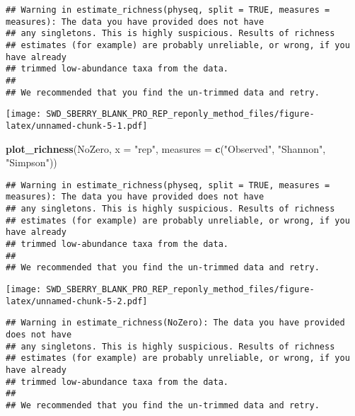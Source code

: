 \documentclass[]{article}
\newenvironment{Shaded}{\begin{snugshade}}{\end{snugshade}}
\newcommand{\KeywordTok}[1]{\textcolor[rgb]{0.13,0.29,0.53}{\textbf{#1}}}
\newcommand{\DataTypeTok}[1]{\textcolor[rgb]{0.13,0.29,0.53}{#1}}
\newcommand{\StringTok}[1]{\textcolor[rgb]{0.31,0.60,0.02}{#1}}
\newcommand{\OperatorTok}[1]{\textcolor[rgb]{0.81,0.36,0.00}{\textbf{#1}}}
\newcommand{\NormalTok}[1]{#1}
\begin{document}
\begin{verbatim}
## Warning in estimate_richness(physeq, split = TRUE, measures = measures): The data you have provided does not have
## any singletons. This is highly suspicious. Results of richness
## estimates (for example) are probably unreliable, or wrong, if you have already
## trimmed low-abundance taxa from the data.
## 
## We recommended that you find the un-trimmed data and retry.
\end{verbatim}

\texttt{[image: SWD\_SBERRY\_BLANK\_PRO\_REP\_reponly\_method\_files/figure-latex/unnamed-chunk-5-1.pdf]}

\begin{Shaded}
\begin{Highlighting}[]
\KeywordTok{plot_richness}\NormalTok{(NoZero, }\DataTypeTok{x =} \StringTok{"rep"}\NormalTok{, }\DataTypeTok{measures =} \KeywordTok{c}\NormalTok{(}\StringTok{"Observed"}\NormalTok{, }\StringTok{"Shannon"}\NormalTok{, }\StringTok{"Simpson"}\NormalTok{))}
\end{Highlighting}
\end{Shaded}

\begin{verbatim}
## Warning in estimate_richness(physeq, split = TRUE, measures = measures): The data you have provided does not have
## any singletons. This is highly suspicious. Results of richness
## estimates (for example) are probably unreliable, or wrong, if you have already
## trimmed low-abundance taxa from the data.
## 
## We recommended that you find the un-trimmed data and retry.
\end{verbatim}

\texttt{[image: SWD\_SBERRY\_BLANK\_PRO\_REP\_reponly\_method\_files/figure-latex/unnamed-chunk-5-2.pdf]}

\begin{Shaded}
\end{Shaded}

\begin{verbatim}
## Warning in estimate_richness(NoZero): The data you have provided does not have
## any singletons. This is highly suspicious. Results of richness
## estimates (for example) are probably unreliable, or wrong, if you have already
## trimmed low-abundance taxa from the data.
## 
## We recommended that you find the un-trimmed data and retry.
\end{verbatim}
\end{document}
